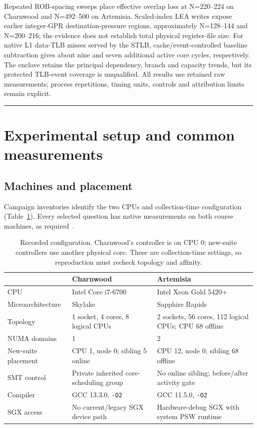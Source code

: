 \documentclass[11pt,letterpaper]{article}
\begin{document}
Repeated ROB-spacing sweeps place effective overlap loss at N=220--224 on
Charnwood and N=492--500 on Artemisia. Scaled-index LEA writes expose earlier
integer-GPR destination-pressure regions, approximately N=128--144 and
N=200--216; the evidence does not establish total physical register-file size.
For native L1 data-TLB misses served by the STLB, cache/event-controlled
baseline subtraction gives about nine and seven additional active core cycles,
respectively. The enclave retains the principal dependency, branch and
capacity trends, but its protected TLB-event coverage is unqualified. All
results use retained raw measurements; process repetitions, timing units,
controls and attribution limits remain explicit.
\vspace{5pt}\hrule
\clearpage

\section{Experimental setup and common measurements}\label{sec:setup}
\subsection{Machines and placement}
Campaign inventories identify the two CPUs and collection-time configuration
(Table~\ref{tab:machines}). Every selected question has native measurements
on both course machines, as required~\cite{assignment}.
\begin{table}[!htbp]\centering\small
\begin{tabularx}{\linewidth}{lXX}
\toprule
 & Charnwood & Artemisia\\\midrule
CPU & Intel Core i7-6700 & Intel Xeon Gold 5420+\\
Microarchitecture & Skylake & Sapphire Rapids\\
Topology & 1 socket, 4 cores, 8 logical CPUs & 2 sockets, 56 cores, 112 logical CPUs; CPU 68 offline\\
NUMA domains & 1 & 2\\
New-suite placement & CPU 1, node 0; sibling 5 online & CPU 12, node 0; sibling 68 offline\\
SMT control & Private inherited core-scheduling group & No online sibling; before/after activity gate\\
Compiler & GCC 13.3.0, \texttt{-O2} & GCC 11.5.0, \texttt{-O2}\\
SGX access & No current/legacy SGX device path & Hardware-debug SGX with system PSW runtime\\
\bottomrule
\end{tabularx}
\caption{Recorded configuration. Charnwood's controller is on CPU 0; new-suite controllers use another physical core. These are collection-time settings, so reproduction must recheck topology and affinity.}\label{tab:machines}
\end{table}
\end{document}
